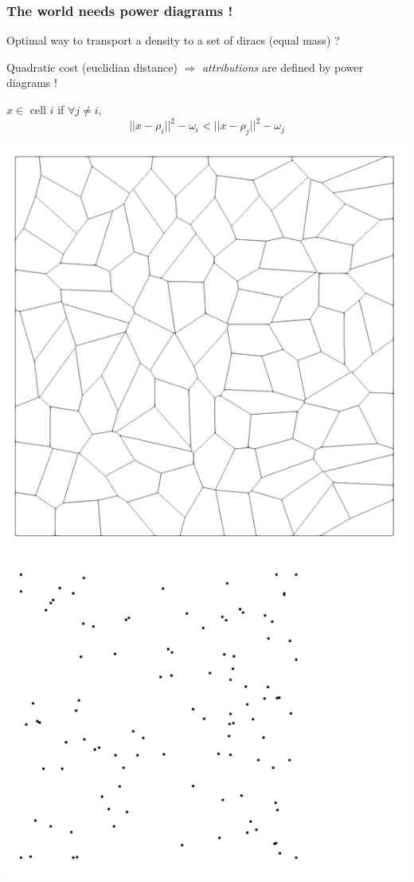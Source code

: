 \documentclass[aspectratio=169]{beamer}
\begin{document}
\begin{frame}
    \frametitle{The world needs power diagrams !}

    \begin{minipage}[c][0.6\textheight][c]{0.5\textwidth}
        Optimal way to transport a density to a set of diracs (equal mass) ? 
        
        \vfill
        Quadratic cost (euclidian distance) $\Rightarrow$ \textit{attributions} are defined by power diagrams !
        
        \vfill
        $x \in$ cell $i$ if $\forall j \neq i$,
         $$|| x - \rho_i ||^2 - \omega_i < || x - \rho_j ||^2 - \omega_j $$
    \end{minipage}
    \kern 0.5cm
    \begin{minipage}{0.45\textwidth}
        \begin{center}
            \includegraphics[height=0.8\textheight]{img/pd.png}
        \end{center}
    \end{minipage}
\end{frame}
\end{document}
